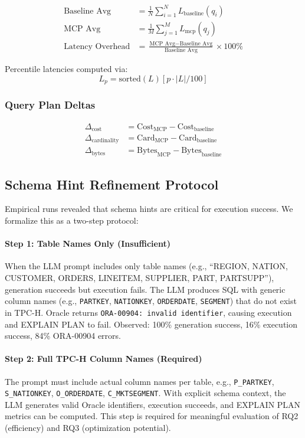 \begin{align}
\text{Baseline Avg} &= \frac{1}{N}\sum_{i=1}^{N}L_{\text{baseline}}(q_i) \\
\text{MCP Avg} &= \frac{1}{M}\sum_{j=1}^{M}L_{\text{mcp}}(q_j) \\
\text{Latency Overhead} &= \frac{\text{MCP Avg} - \text{Baseline Avg}}{\text{Baseline Avg}} \times 100\%
\end{align}

Percentile latencies computed via:
\begin{equation}
L_p = \text{sorted}(L)[p \cdot |L| / 100]
\end{equation}

\subsubsection{Query Plan Deltas}

\begin{align}
\Delta_{\text{cost}} &= \text{Cost}_{\text{MCP}} - \text{Cost}_{\text{baseline}} \\
\Delta_{\text{cardinality}} &= \text{Card}_{\text{MCP}} - \text{Card}_{\text{baseline}} \\
\Delta_{\text{bytes}} &= \text{Bytes}_{\text{MCP}} - \text{Bytes}_{\text{baseline}}
\end{align}

\subsection{Schema Hint Refinement Protocol}

Empirical runs revealed that schema hints are critical for execution success. We formalize this as a two-step protocol:

\paragraph{Step 1: Table Names Only (Insufficient)}
When the LLM prompt includes only table names (e.g., ``REGION, NATION, CUSTOMER, ORDERS, LINEITEM, SUPPLIER, PART, PARTSUPP''), generation succeeds but execution fails. The LLM produces SQL with generic column names (e.g., \texttt{PARTKEY}, \texttt{NATIONKEY}, \texttt{ORDERDATE}, \texttt{SEGMENT}) that do not exist in TPC-H. Oracle returns \texttt{ORA-00904: invalid identifier}, causing execution and EXPLAIN PLAN to fail. Observed: 100\% generation success, 16\% execution success, 84\% ORA-00904 errors.

\paragraph{Step 2: Full TPC-H Column Names (Required)}
The prompt must include actual column names per table, e.g., \texttt{P\_PARTKEY}, \texttt{S\_NATIONKEY}, \texttt{O\_ORDERDATE}, \texttt{C\_MKTSEGMENT}. With explicit schema context, the LLM generates valid Oracle identifiers, execution succeeds, and EXPLAIN PLAN metrics can be computed. This step is required for meaningful evaluation of RQ2 (efficiency) and RQ3 (optimization potential).

